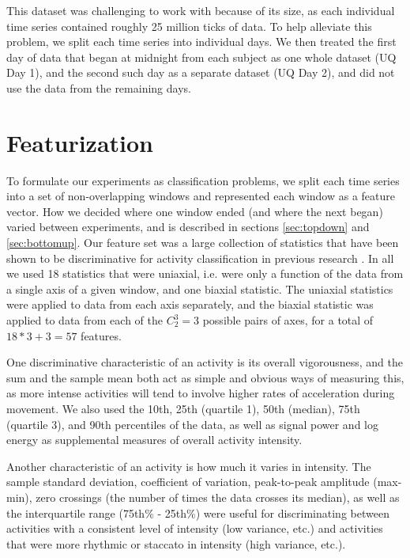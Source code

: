 This dataset was challenging to work with because of its size, as each individual time series
contained roughly 25 million ticks of data. To help alleviate this problem, we split each
time series into individual days. We then treated the first day of data that began at midnight
from each subject as one whole dataset (UQ Day 1), and the second such day as a separate dataset
(UQ Day 2), and did not use the data from the remaining days.


\section{Featurization}
To formulate our experiments as classification problems, we split each time series into a set of
non-overlapping windows and represented each window as a feature vector.
How we decided where one window ended (and where the next began) varied between
experiments, and is described in sections \ref{sec:topdown} and \ref{sec:bottomup}. Our feature
set was a large collection of statistics that have been shown to be discriminative
for activity classification in previous research \cite{li09} \cite{rothney07}
\cite{staudenmeyer09} \cite{zheng12}. In all we used 18 statistics that were
uniaxial, i.e. were only a function of the data from a single axis of a given window,
and one biaxial statistic.
The uniaxial statistics were applied to data from each axis separately, and
the biaxial statistic was applied to data from each of the $C_2^3=3$ possible pairs of
axes, for a total of $18*3+3 = 57$ features.

One discriminative characteristic of an activity is its overall vigorousness,
and the sum and the sample mean both act as simple and obvious ways of measuring this,
as more intense activities will tend to involve
higher rates of acceleration during movement. We also used the 10th, 25th (quartile 1),
50th (median), 75th (quartile 3), and 90th percentiles of the data, as well as signal
power and log energy as supplemental measures of overall activity intensity.

Another characteristic of an activity is how much it varies in intensity. The sample standard
deviation, coefficient of variation, peak-to-peak amplitude (max-min), zero crossings
(the number of times the data crosses its median), as well as the
interquartile range (75th\% - 25th\%) were useful for discriminating between activities
with a consistent level of intensity (low variance, etc.) and activities that were more
rhythmic or staccato in intensity (high variance, etc.). 

